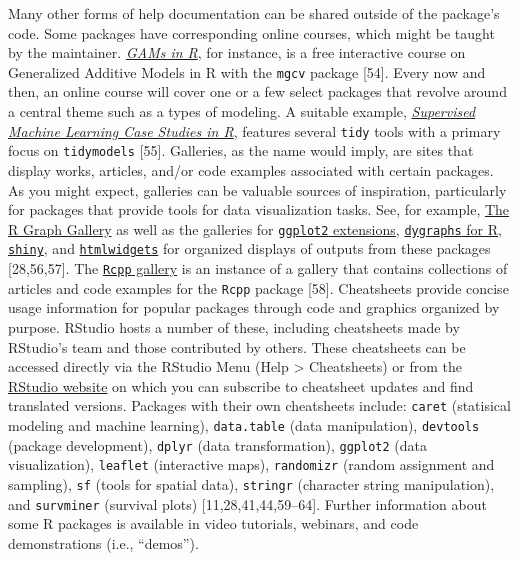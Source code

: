 \documentclass[10pt,letterpaper]{article}
\begin{document}
Many other forms of help documentation can be shared outside of the
package's code. Some packages have corresponding online courses, which
might be taught by the maintainer.
\href{https://noamross.github.io/gams-in-r-course/}{\emph{GAMs in R}},
for instance, is a free interactive course on Generalized Additive
Models in R with the \texttt{mgcv} package {[}54{]}. Every now and then,
an online course will cover one or a few select packages that revolve
around a central theme such as a types of modeling. A suitable example,
\href{https://supervised-ml-course.netlify.app/}{\emph{Supervised
Machine Learning Case Studies in R}}, features several \texttt{tidy}
tools with a primary focus on \texttt{tidymodels} {[}55{]}. Galleries,
as the name would imply, are sites that display works, articles, and/or
code examples associated with certain packages. As you might expect,
galleries can be valuable sources of inspiration, particularly for
packages that provide tools for data visualization tasks. See, for
example, \href{https://www.r-graph-gallery.com/}{The R Graph Gallery} as
well as the galleries for
\href{https://exts.ggplot2.tidyverse.org/gallery/}{\texttt{ggplot2}
extensions},
\href{https://rstudio.github.io/dygraphs/index.html}{\texttt{dygraphs}
for R}, \href{https://shiny.rstudio.com/gallery/}{\texttt{shiny}}, and
\href{https://gallery.htmlwidgets.org/}{\texttt{htmlwidgets}} for
organized displays of outputs from these packages {[}28,56,57{]}. The
\href{https://gallery.rcpp.org/}{\texttt{Rcpp} gallery} is an instance
of a gallery that contains collections of articles and code examples for
the \texttt{Rcpp} package {[}58{]}. Cheatsheets provide concise usage
information for popular packages through code and graphics organized by
purpose. RStudio hosts a number of these, including cheatsheets made by
RStudio's team and those contributed by others. These cheatsheets can be
accessed directly via the RStudio Menu (Help \textgreater{} Cheatsheets)
or from the \href{https://rstudio.com/resources/cheatsheets/}{RStudio
website} on which you can subscribe to cheatsheet updates and find
translated versions. Packages with their own cheatsheets include:
\texttt{caret} (statisical modeling and machine learning),
\texttt{data.table} (data manipulation), \texttt{devtools} (package
development), \texttt{dplyr} (data transformation), \texttt{ggplot2}
(data visualization), \texttt{leaflet} (interactive maps),
\texttt{randomizr} (random assignment and sampling), \texttt{sf} (tools
for spatial data), \texttt{stringr} (character string manipulation), and
\texttt{survminer} (survival plots) {[}11,28,41,44,59--64{]}. Further
information about some R packages is available in video tutorials,
webinars, and code demonstrations (i.e., ``demos'').
\end{document}
